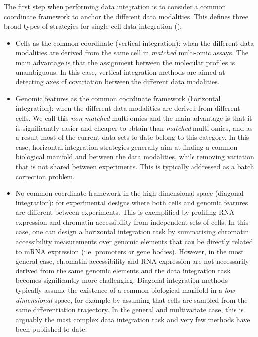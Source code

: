 The first step when performing data integration is to consider a common coordinate framework to anchor the different data modalities. This defines three broad types of strategies for single-cell data integration (): 

\begin{itemize}

	\item Cells as the common coordinate (vertical integration): when the different data modalities are derived from the same cell in \textit{matched} multi-omic assays. The main advantage is that the assignment between the molecular profiles is unambiguous. In this case, vertical integration methods are aimed at detecting axes of covariation between the different data modalities. 

	\item Genomic features as the common coordinate framework (horizontal integration): when the different data modalities are derived from different cells. We call this \textit{non-matched} multi-omics and the main advantage is that it is significantly easier and cheaper to obtain than \textit{matched} multi-omics, and as a result most of the current data sets to date belong to this category. In this case, horizontal integration strategies generally aim at finding a common biological manifold and between the data modalities, while removing variation that is not shared between experiments. This is typically addressed as a batch correction problem.

	\item No common coordinate framework in the high-dimensional space (diagonal integration): for experimental designs where both cells and genomic features are different between experiments. This is exemplified by profiling RNA expression and chromatin accessibility from independent sets of cells. In this case, one can design a horizontal integration task by summarising chromatin accessibility measurements over genomic elements that can be directly related to mRNA expression (i.e. promoters or gene bodies). However, in the most general case, chromatin accessibility and RNA expression are not necessarily derived from the same genomic elements and the data integration task becomes significantly more challenging. Diagonal integration methods typically assume the existence of a common biological manifold in a \textit{low-dimensional} space, for example by assuming that cells are sampled from the same differentiation trajectory. In the general and multivariate case, this is arguably the most complex data integration task and very few methods have been published to date.

\end{itemize}

